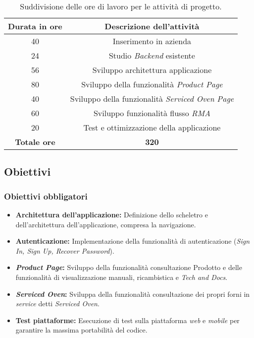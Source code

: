 \begin{table}[ht]
    \centering
    \begin{tabular}{c|c}
    \hline\hline
    \textbf{Durata in ore} & \textbf{Descrizione dell'attività} \\
    \hline\hline
    40 & Inserimento in azienda \\
    \hline
    24 & Studio \textit{Backend} esistente \\
    \hline
    56 & Sviluppo architettura applicazione\\
    \hline
    80 & Sviluppo della funzionalità \textit{Product Page} \\
    \hline
    40 & Sviluppo della funzionalità \textit{Serviced Oven Page} \\
    \hline
    60 & Sviluppo funzionalità flusso \textit{RMA} \\
    \hline
    20 & Test e ottimizzazione della applicazione \\
    \hline
    \textbf{Totale ore} & \textbf{320} \\
    \hline\hline
    \end{tabular}
    \caption{Suddivisione delle ore di lavoro per le attività di progetto.}
    \label{tab:ore-lavoro}
    \end{table}

\subsection{Obiettivi}
\subsubsection{Obiettivi obbligatori}
\begin{itemize}
    \item \textbf{Architettura dell'applicazione:} Definizione dello scheletro e dell'architettura dell'applicazione, compresa la navigazione.
    \item \textbf{Autenticazione: } Implementazione della funzionalità di autenticazione (\textit{Sign In, Sign Up, Recover Password}).
    \item \textbf{\textit{Product Page}: }Sviluppo della funzionalità consultazione Prodotto e delle funzionalità di visualizzazione manuali, ricambistica e \textit{Tech and Docs}.
    \item \textbf{\textit{Serviced Oven}: }Sviluppa della funzionalità consultazione dei propri forni in \textit{service} detti \textit{Serviced Oven}.
    \item \textbf{Test piattaforme: } Esecuzione di test sulla piattaforma \textit{web} e \textit{mobile} per garantire la massima portabilità del codice.

\end{itemize}


